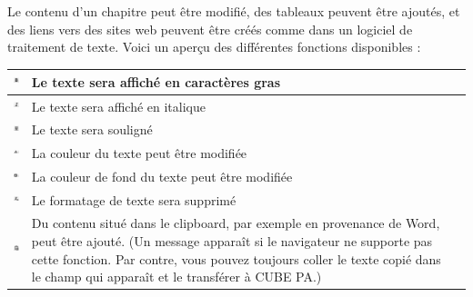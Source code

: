 Le contenu d'un chapitre peut être modifié, des tableaux peuvent être ajoutés, et des liens vers des sites web peuvent être créés comme dans un logiciel de traitement de texte. Voici un aperçu des différentes fonctions disponibles : \\

\begin{tabular}{c | p{14cm} l} %
\hline
\includegraphics[height=12pt]{../chapters/09_Qualitaetsmanagement/pictures/Format/Fett.jpg} & Le texte sera affiché en caractères gras \\
\hline
\includegraphics[height=12pt]{../chapters/09_Qualitaetsmanagement/pictures/Format/Kursiv.jpg} & Le texte sera affiché en italique \\
\hline
\includegraphics[height=12pt]{../chapters/09_Qualitaetsmanagement/pictures/Format/Unterstrichen.jpg} & Le texte sera souligné \\
\hline
\includegraphics[height=12pt]{../chapters/09_Qualitaetsmanagement/pictures/Format/Textfarbe.jpg} & La couleur du texte peut être modifiée \\
\hline
\includegraphics[height=12pt]{../chapters/09_Qualitaetsmanagement/pictures/Format/Hintergrundfarbe.jpg} & La couleur de fond du texte peut être modifiée \\
\hline
\includegraphics[height=12pt]{../chapters/09_Qualitaetsmanagement/pictures/Format/Form_z.jpg} & Le formatage de texte sera supprimé \\
\hline
\includegraphics[height=12pt]{../chapters/09_Qualitaetsmanagement/pictures/Format/ausWord.jpg} & Du contenu situé dans le clipboard, par exemple en provenance de Word, peut être ajouté. (Un message apparaît si le navigateur ne supporte pas cette fonction. Par contre, vous pouvez toujours coller le texte copié dans le champ qui apparaît et le transférer à CUBE PA.) \\

\end{tabular}
